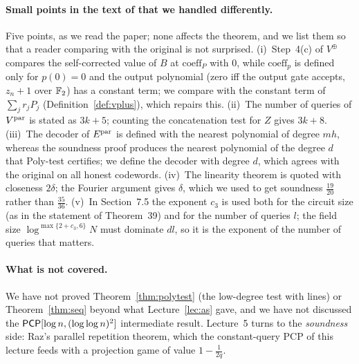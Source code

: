 \paragraph{Small points in the text of \citet{ALMSS98} that we handled differently.}
Five points, as we read the paper; none affects the theorem, and we list them so that a reader comparing with the original is not surprised.
(i)~Step~4(c) of $V^\oplus$ compares the self-corrected value of $B$ at $\mathrm{coeff}_P$ with $0$, while $\mathrm{coeff}_p$ is defined only for $p(0)=0$ and the output polynomial (zero iff the output gate accepts, \ie $z_n+1$ over $\mathbb{F}_2$) has a constant term; we compare with the constant term of $\sum_jr_jP_j$ (Definition~\ref{def:vplus}), which repairs this.
(ii)~The number of queries of $V^{\rm par}$ is stated as $3k+5$; counting the concatenation test for $Z$ gives $3k+8$.
(iii)~The decoder of $E^{\rm par}$ is defined with the nearest polynomial of degree $mh$, whereas the soundness proof produces the nearest polynomial of the degree $d$ that Poly-test certifies; we define the decoder with degree $d$, which agrees with the original on all honest codewords.
(iv)~The linearity theorem is quoted with closeness $2\delta$; the Fourier argument gives $\delta$, which we used to get soundness $\tfrac{19}{20}$ rather than $\tfrac{35}{36}$.
(v)~In Section~7.5 the exponent $c_3$ is used both for the circuit size (as in the statement of Theorem~39) and for the number of queries $l$; the field size $\log^{\max\{2+c_3,6\}}N$ must dominate $dl$, so it is the exponent of the number of queries that matters.

\paragraph{What is not covered.}
We have not proved Theorem~\ref{thm:polytest} (the low-degree test with lines) or Theorem~\ref{thm:seq} beyond what Lecture~\ref{lec:as} gave, and we have not discussed the $\mathsf{PCP}[\log n,(\log\log n)^2]$ intermediate result.
Lecture~5 turns to the \emph{soundness} side: Raz's parallel repetition theorem, which the constant-query PCP of this lecture feeds with a projection game of value $1-\frac1{2q}$.
